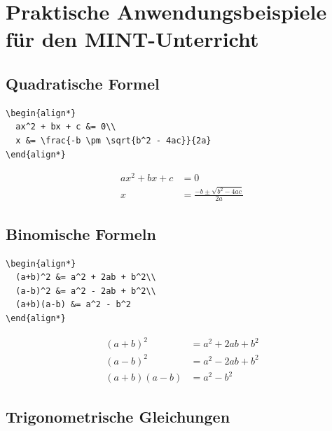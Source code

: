 \documentclass[12pt,a4paper]{article}
\begin{document}
\section{Praktische Anwendungsbeispiele für den MINT-Unterricht}



\subsection{Quadratische Formel}

\begin{lstlisting}[style=latex]
\begin{align*}
  ax^2 + bx + c &= 0\\
  x &= \frac{-b \pm \sqrt{b^2 - 4ac}}{2a}
\end{align*}
\end{lstlisting}

\begin{ausgabe}
\begin{align*}
  ax^2 + bx + c &= 0\\
  x &= \frac{-b \pm \sqrt{b^2 - 4ac}}{2a}
\end{align*}
\end{ausgabe}



\subsection{Binomische Formeln}

\begin{lstlisting}[style=latex]
\begin{align*}
  (a+b)^2 &= a^2 + 2ab + b^2\\
  (a-b)^2 &= a^2 - 2ab + b^2\\
  (a+b)(a-b) &= a^2 - b^2
\end{align*}
\end{lstlisting}

\begin{ausgabe}
\begin{align*}
  (a+b)^2 &= a^2 + 2ab + b^2\\
  (a-b)^2 &= a^2 - 2ab + b^2\\
  (a+b)(a-b) &= a^2 - b^2
\end{align*}
\end{ausgabe}



\subsection{Trigonometrische Gleichungen}
\end{document}
